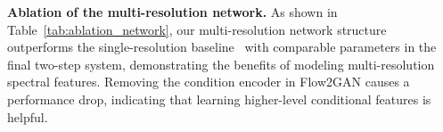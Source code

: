  \begin{table}[h!]
\centering
\caption{Comparison to Shortcut models on LibriTTS dev set with Mel-spectrogram conditioning.}
\vspace{-0.5em}
\label{tab:comp_shortcut}
\setlength{\tabcolsep}{6pt} %
\vspace{-0.5em}
\end{table}

\noindent\textbf{Ablation of the multi-resolution network.} As shown in Table~\ref{tab:ablation_network}, our multi-resolution network structure outperforms the single-resolution baseline~\citep{vocos} with comparable parameters in the final two-step system, demonstrating the benefits of modeling multi-resolution spectral features. 
Removing the condition encoder in Flow2GAN causes a performance drop, indicating that learning higher-level conditional features is helpful.



